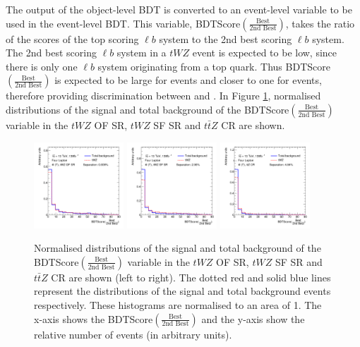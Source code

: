 The output of the object-level BDT is converted to an event-level variable to be used in the event-level BDT. This variable, BDTScore$(\frac{\text{Best}}{\text{2nd Best}})$, takes the ratio of the scores of the top scoring $\ell b$ system to the 2nd best scoring $\ell b$ system. The 2nd best scoring $\ell b$ system in a $tWZ$ event is expected to be low, since there is only one $\ell b$ system originating from a top quark. Thus BDTScore$(\frac{\text{Best}}{\text{2nd Best}})$ is expected to be large for \tWZ events and closer to one for \ttZ events, therefore providing discrimination between \tWZ and \ttZ. In Figure \ref{fig:bdtscore-bestover2ndbest}, normalised distributions of the signal and total background of the BDTScore$(\frac{\text{Best}}{\text{2nd Best}})$ variable in the $tWZ$ OF SR, $tWZ$ SF SR and $t\bar{t}Z$ CR are shown.
\begin{figure}[h!]
    \centering
    \includegraphics[width=0.3\textwidth]{figures/bdtPlots/lep4_tWZ_4T_OF_BDT_Score_bestOver2ndBest_noExclusion.png}
    \includegraphics[width=0.3\textwidth]{figures/bdtPlots/lep4_tWZ_4T_SF_BDT_Score_bestOver2ndBest_noExclusion.png}
    \includegraphics[width=0.3\textwidth]{figures/bdtPlots/lep4_ttZ_4T_BDT_Score_bestOver2ndBest_noExclusion.png}
    \caption{Normalised distributions of the signal and total background of the BDTScore$(\frac{\text{Best}}{\text{2nd Best}})$ variable in the $tWZ$ OF SR, $tWZ$ SF SR and $t\bar{t}Z$ CR are shown (left to right). The dotted red and solid blue lines represent the distributions of the signal and total background events respectively. These histograms are normalised to an area of 1. The x-axis shows the BDTScore$(\frac{\text{Best}}{\text{2nd Best}})$ and the y-axis show the relative number of events (in arbitrary units).}
    \label{fig:bdtscore-bestover2ndbest}
\end{figure}

